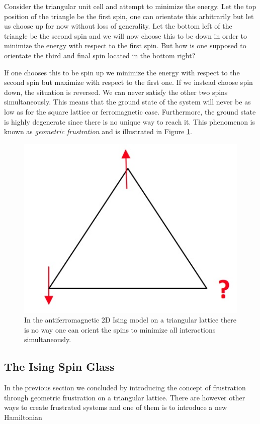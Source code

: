 \documentclass[paper=a4, fontsize=11pt]{scrartcl} %
\numberwithin{equation}{section} %
\numberwithin{figure}{section} %
\numberwithin{table}{section} %
\begin{document}
Consider the triangular unit cell and attempt to minimize the energy. Let the top position of the triangle be the first spin, one can orientate this arbitrarily but let us choose up for now without loss of generality. Let the bottom left of the triangle be the second spin and we will now choose this to be down in order to minimize the energy with respect to the first spin. But how is one supposed to orientate the third and final spin located in the bottom right? 

If one chooses this to be spin up we minimize the energy with respect to the second spin but maximize with respect to the first one. If we instead choose spin down, the situation is reversed. We can never satisfy the other two spins simultaneously. This means that the ground state of the system will never be as low as for the square lattice or ferromagnetic case. Furthermore, the ground state is highly degenerate since there is no unique way to reach it. This phenomenon is known as \emph{geometric frustration} and is illustrated in Figure \ref{fig:frustration}.

\begin{figure}
\centering
\includegraphics[scale=0.5]{images/frustration.jpg}
\caption{In the antiferromagnetic 2D Ising model on a triangular lattice there is no way one can orient the spins to minimize all interactions simultaneously.}
\label{fig:frustration}
\end{figure}

\subsection{The Ising Spin Glass}
In the previous section we concluded by introducing the concept of frustration through geometric frustration on a triangular lattice. There are however other ways to create frustrated systems and one of them is to introduce a new Hamiltonian
\end{document}
